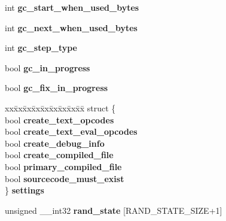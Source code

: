 \begin{DoxyCompactItemize}
\item 
int {\bfseries gc\+\_\+start\+\_\+when\+\_\+used\+\_\+bytes}\hypertarget{class_object_script_1_1_o_s_1_1_core_abf0034c38b065ddb7bab09e3bee397f1}{}\label{class_object_script_1_1_o_s_1_1_core_abf0034c38b065ddb7bab09e3bee397f1}

\item 
int {\bfseries gc\+\_\+next\+\_\+when\+\_\+used\+\_\+bytes}\hypertarget{class_object_script_1_1_o_s_1_1_core_a9024d61977d9d1c9ee60acd73928ad1f}{}\label{class_object_script_1_1_o_s_1_1_core_a9024d61977d9d1c9ee60acd73928ad1f}

\item 
int {\bfseries gc\+\_\+step\+\_\+type}\hypertarget{class_object_script_1_1_o_s_1_1_core_adbef3cb6a50ba64d9b6f8c9e3024f859}{}\label{class_object_script_1_1_o_s_1_1_core_adbef3cb6a50ba64d9b6f8c9e3024f859}

\item 
bool {\bfseries gc\+\_\+in\+\_\+progress}\hypertarget{class_object_script_1_1_o_s_1_1_core_a34cd441f61464908d64c03e1884669af}{}\label{class_object_script_1_1_o_s_1_1_core_a34cd441f61464908d64c03e1884669af}

\item 
bool {\bfseries gc\+\_\+fix\+\_\+in\+\_\+progress}\hypertarget{class_object_script_1_1_o_s_1_1_core_a2fb091d4b6d202e4d1046e82726232b7}{}\label{class_object_script_1_1_o_s_1_1_core_a2fb091d4b6d202e4d1046e82726232b7}

\item 
\begin{tabbing}
xx\=xx\=xx\=xx\=xx\=xx\=xx\=xx\=xx\=\kill
struct \{\\
\>bool {\bfseries create\_text\_opcodes}\\
\>bool {\bfseries create\_text\_eval\_opcodes}\\
\>bool {\bfseries create\_debug\_info}\\
\>bool {\bfseries create\_compiled\_file}\\
\>bool {\bfseries primary\_compiled\_file}\\
\>bool {\bfseries sourcecode\_must\_exist}\\
\} {\bfseries settings}\hypertarget{class_object_script_1_1_o_s_1_1_core_a45b36d816e565561df8856cb965f410a}{}\label{class_object_script_1_1_o_s_1_1_core_a45b36d816e565561df8856cb965f410a}
\\

\end{tabbing}\item 
unsigned \+\_\+\+\_\+int32 {\bfseries rand\+\_\+state} \mbox{[}R\+A\+N\+D\+\_\+\+S\+T\+A\+T\+E\+\_\+\+S\+I\+ZE+1\mbox{]}\hypertarget{class_object_script_1_1_o_s_1_1_core_ad066d528054fa7e63dcaa4ec2dfe81f4}{}\label{class_object_script_1_1_o_s_1_1_core_ad066d528054fa7e63dcaa4ec2dfe81f4}


\end{DoxyCompactItemize}

